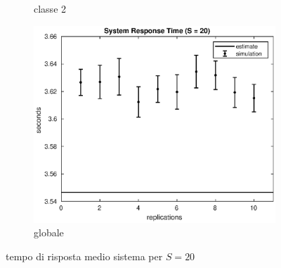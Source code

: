 \begin{figure}[!h]
\begin{subfigure}[t]{0.49\textwidth}
\caption{classe 2}
\label{20_s2}
\end{subfigure}
%
\begin{subfigure}[t]{0.5\textwidth}
\includegraphics[width=\textwidth]{figures/simul/20_500K_s}
\caption{globale}
\label{20_s}
\end{subfigure}
%
\caption{tempo di risposta medio sistema per $S = 20$}
\end{figure}
%

